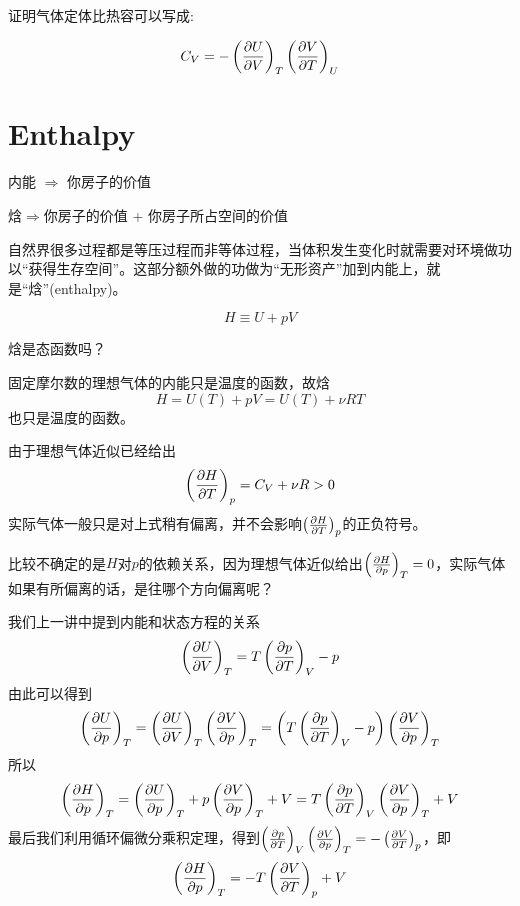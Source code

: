 \documentclass[CJK]{beamer}
\begin{document}
\begin{frame}
\bch
{}

证明气体定体比热容可以写成:

$$
C_V =  - \pfrac UVT \pfrac VTU 
$$

\ech
\end{frame}


\section{Enthalpy}

\begin{frame}
\bch

内能 $\Rightarrow$ 你房子的价值

焓$\Rightarrow$你房子的价值 + 你房子所占空间的价值

\skipline

自然界很多过程都是等压过程而非等体过程，当体积发生变化时就需要对环境做功以“获得生存空间”。这部分额外做的功做为“无形资产”加到内能上，就是“焓”(enthalpy)。

$$ H \equiv U + pV$$


\ech
\end{frame}

\begin{frame}
\bch
{}
焓是态函数吗？
\ech
\end{frame}


\begin{frame}
\bch
固定摩尔数的理想气体的内能只是温度的函数，故焓
$$H = U(T) + pV = U(T) + \nu R T$$
也只是温度的函数。
\ech
\end{frame}

\begin{frame}
\bch
由于理想气体近似已经给出
$$\pfrac HTp =  C_V+ \nu R > 0$$
实际气体一般只是对上式稍有偏离，并不会影响$\pfrac HTp $的正负符号。

比较不确定的是$H$对$p$的依赖关系，因为理想气体近似给出$\pfrac HpT = 0$，实际气体如果有所偏离的话，是往哪个方向偏离呢？
\ech
\end{frame}

\begin{frame}
\bch
{\small
我们上一讲中提到内能和状态方程的关系{\blue
$$\pfrac UVT = T\pfrac pTV - p$$}
由此可以得到
$$\pfrac UpT = \pfrac UVT\pfrac VpT= \left(T\pfrac pTV - p\right) \pfrac VpT$$
所以
$$\pfrac HpT = \pfrac UpT  + p\pfrac VpT + V = T\pfrac pTV \pfrac VpT + V$$
最后我们利用循环偏微分乘积定理，得到$\pfrac pTV \pfrac VpT = - \pfrac VTp$，即
{\blue
$$\pfrac HpT = - T\pfrac VTp + V$$
}}
\ech
\end{frame}
\end{document}
